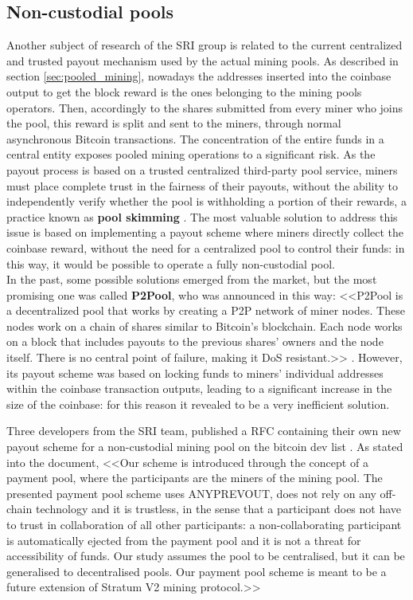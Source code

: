 \subsection{Non-custodial pools}
Another subject of research of the SRI group is related to the current centralized and trusted payout mechanism used by the actual mining pools.
As described in section \ref{sec:pooled_mining}, nowadays the addresses inserted into the coinbase output to get the block reward is the ones belonging to the mining pools operators. Then, accordingly to the shares submitted from every miner who joins the pool, this reward is split and sent to the miners, through normal asynchronous Bitcoin transactions. The concentration of the entire funds in a central entity exposes pooled mining operations to a significant risk. As the payout process is based on a trusted centralized third-party pool service, miners must place complete trust in the fairness of their payouts, without the ability to independently verify whether the pool is withholding a portion of their rewards, a practice known as \textbf{pool skimming} \cite{bitcointalkMiningPool}.
The most valuable solution to address this issue is based on implementing a payout scheme where miners directly collect the coinbase reward, without the need for a centralized pool to control their funds: in this way, it would be possible to operate a fully non-custodial pool.\\
In the past, some possible solutions emerged from the market, but the most promising one was called \textbf{P2Pool}, who was announced in this way: <<P2Pool is a decentralized pool that works by creating a P2P network of miner nodes. These nodes work on a chain of shares similar to Bitcoin's blockchain. Each node works on a block that includes payouts to the previous shares' owners and the node itself. There is no central point of failure, making it DoS resistant.>> \cite{bitcointalk1500P2pool}.
However, its payout scheme was based on locking funds to miners' individual addresses within the coinbase transaction outputs, leading to a significant increase in the size of the coinbase: for this reason it revealed to be a very inefficient solution.

\noindent Three developers from the SRI team, published a RFC containing their own new payout scheme for a non-custodial mining pool on the bitcoin dev list \cite{linuxfoundationbitcoindevPayout}. As stated into the document, <<Our scheme is introduced through the concept of a payment pool, where the participants are the miners of the mining pool. The presented payment pool scheme uses ANYPREVOUT\cite{anyprevoutBIP118SIGHASH_ANYPREVOUT}, does not rely on any off-chain technology and it is trustless, in the sense that a participant does not have to trust in collaboration of all other participants: a non-collaborating participant is automatically ejected from the payment pool and it is not a threat for accessibility of funds. Our study assumes the pool to be centralised, but it can be generalised to decentralised pools. Our payment pool scheme is meant to be a future extension of Stratum V2 mining protocol.>> \cite{googleRFCpayment_pools03}


